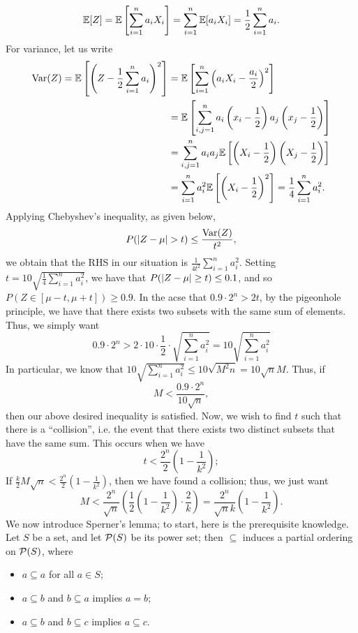 \[ \mathbb E[Z] = \mathbb E\left[\sum_{i=1}^n a_i X_i\right] = \sum_{i=1}^n \mathbb E[a_iX_i] = \frac{1}{2} \sum_{i=1}^n a_i. \]
For variance, let us write
\begin{align*}
    \operatorname{Var}(Z) = \mathbb E\left[\left(Z - \frac{1}{2} \sum_{i=1}^n a_i\right)^2\right] &= \mathbb E\left[ \sum_{i=1}^n \left(a_i X_i - \frac{a_i}{2}\right)^2 \right] \\
    &= \mathbb E\left[\sum_{i,j = 1}^n a_i\left(x_i - \frac{1}{2}\right) a_j\left(x_j - \frac{1}{2}\right) \right] \\
    &= \sum_{i,j = 1}^n a_ia_j \mathbb E \left[\left(X_i - \frac{1}{2}\right)\left(X_j - \frac{1}{2}\right)\right] \\
    &= \sum_{i=1}^n a_i^2 \mathbb E\left[\left(X_i - \frac{1}{2}\right)^2\right] = \frac{1}{4} \sum_{i=1}^n a_i^2.
\end{align*}
Applying Chebyshev's inequality, as given below,
\[ P(\left\lvert Z - \mu \right\rvert > t) \leq \frac{\operatorname{Var}(Z)}{t^2}, \]
we obtain that the RHS in our situation is $\frac{1}{4t^2} \sum_{i=1}^n a_i^2$. Setting $t = 10 \sqrt{ \frac{1}{4} \sum_{i=1}^n a_i^2 }$, we have that $P(\left\lvert Z - \mu \right\rvert \geq t) \leq 0.1$, and so $P(Z \in [\mu - t, \mu + t]) \geq 0.9$. In the acse that $0.9 \cdot 2^n > 2t$, by the pigeonhole principle, we have that there exists two subsets with the same sum of elements. Thus, we simply want
\[ 0.9 \cdot 2^n > 2 \cdot 10 \cdot \frac{1}{2} \cdot \sqrt{\sum_{i=1}^n a_i^2} = 10 \sqrt{\sum_{i=1}^n a_i^2} \]
In particular, we know that $10 \sqrt{\sum_{i=1}^n a_i^2} \leq 10 \sqrt{M^2 n} = 10 \sqrt{n} M$. Thus, if
\[ M < \frac{0.9 \cdot 2^n}{10 \sqrt{n}}, \]
then our above desired inequality is satisfied. Now, we wish to find $t$ such that there is a ``collision'', i.e. the event that there exists two distinct subsets that have the same sum. This occurs when we have
\[ t < \frac{2^n}{2}\left(1 - \frac{1}{k^2}\right); \]
If $\frac{k}{2} M \sqrt{n} < \frac{2^n}{2} (1 - \frac{1}{k^2})$, then we have found a collision; thus, we just want
\[ M < \frac{2^n}{\sqrt{n}} \left(\frac{1}{2}\left(1 - \frac{1}{k^2}\right) \cdot \frac{2}{k}\right) = \frac{2^n}{\sqrt{n} k} \left(1 - \frac{1}{k^2}\right). \]
We now introduce Sperner's lemma; to start, here is the prerequisite knowledge. Let $S$ be a set, and let $\mathcal P(S)$ be its power set; then $\subseteq$ induces a partial ordering on $\mathcal P(S)$, where
\begin{itemize}
    \item $a \subseteq a$ for all $a \in S$;
    \item $a \subseteq b$ and $b \subseteq a$ implies $a = b$;
    \item $a \subseteq b$ and $b \subseteq c$ implies $a \subseteq c$.
\end{itemize}
